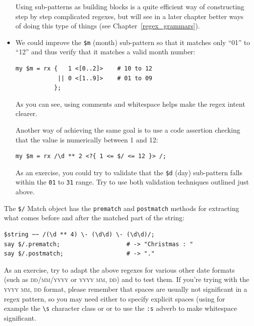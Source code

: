 \begin{itemize}
Using sub-patterns as building blocks is a quite efficient 
way of constructing step by step complicated regexes, but 
will see in a later chapter better ways of doing this 
type of things (see Chapter~\ref{regex_grammars}).

\item We could improve the \verb'$m' (month) sub-pattern so 
that it matches only ``01'' to ``12'' and thus 
verify that it matches a valid month number:

\begin{verbatim}
my $m = rx {   1 <[0..2]>    # 10 to 12
            || 0 <[1..9]>    # 01 to 09
           };
\end{verbatim}
%

As you can see, using comments and whitespace helps 
make the regex intent clearer.

Another way of achieving the same goal is to use a 
code assertion checking that the value is numerically 
between 1 and 12:

\begin{verbatim}
my $m = rx /\d ** 2 <?{ 1 <= $/ <= 12 }> /;
\end{verbatim}

As an exercise, you could try to validate that the \verb'$d' 
(day) sub-pattern falls within the \verb'01' to \verb'31' 
range. Try to use both validation techniques outlined just 
above.

\end{itemize}

The \verb'$/' Match object has the {\tt prematch} and 
{\tt postmatch} methods for extracting what comes before 
and after the matched part of the string: 

\begin{verbatim}
$string ~~ /(\d ** 4) \- (\d\d) \- (\d\d)/;
say $/.prematch;                   # -> "Christmas : "
say $/.postmatch;                  # -> "."
\end{verbatim}
%

As an exercise, try to adapt the above regexes for various 
other date formats (such as \textsc{dd/mm/yyyy} or 
\textsc{yyyy mm, dd}) and to test them. If you're trying with 
the \textsc{yyyy mm, dd} format, please remember that spaces are 
usually not significant in a regex pattern, so you may need 
either to specify explicit spaces (using for example the \verb'\s' 
character class or or to use the \verb':s' adverb to make 
whitespace significant. 


